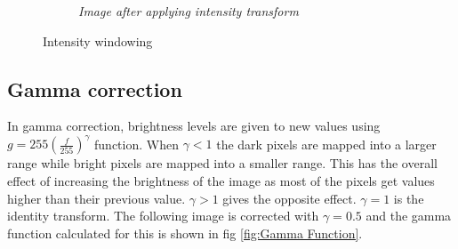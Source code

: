 \documentclass[11pt, a4paper]{article}
\begin{document}
\begin{minipage}{.6\textwidth}
\begin{figure}[H]
\begin{subfigure}[b]{0.59\textwidth}
		\caption{{\small \textit{Image after applying intensity transform}}}
		\label{fig:Windowed Image}
	\end{subfigure}
	\caption{Intensity windowing}
\end{figure}
\end{minipage}

\subsection{Gamma correction}
\begin{minipage}{.4\textwidth}
In gamma correction, brightness levels are given to new values using $g = 255(\frac{f}{255})^{\gamma}$ function. When $\gamma < 1$ the dark pixels are mapped into a larger range while bright pixels are mapped into a smaller range. This has the overall effect of increasing the brightness of the image as most of the pixels get values higher than their previous value. $\gamma > 1$ gives the opposite effect. $\gamma = 1$ is the identity transform. The following image is corrected with $\gamma = 0.5$ and the gamma function calculated for this is shown in fig \ref{fig:Gamma Function}.
\end{minipage}
\hfill
\end{document}
